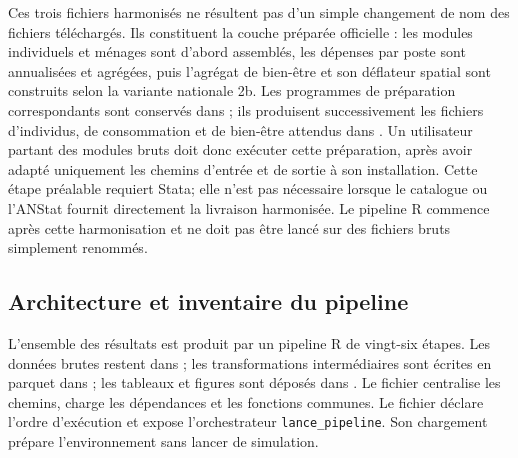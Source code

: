 \documentclass[11pt,a4paper]{article}
\begin{document}
Ces trois fichiers harmonisés ne résultent pas d'un simple changement de nom
des fichiers téléchargés. Ils constituent la couche préparée officielle :
les modules individuels et ménages sont d'abord assemblés, les dépenses par
poste sont annualisées et agrégées, puis l'agrégat de bien-être et son
déflateur spatial sont construits selon la variante nationale 2b. Les
programmes de préparation correspondants sont conservés dans
; ils produisent successivement les fichiers
d'individus, de consommation et de bien-être attendus dans
. Un utilisateur partant des modules bruts doit
donc exécuter cette préparation, après avoir adapté uniquement les chemins
d'entrée et de sortie à son installation. Cette étape préalable requiert Stata;
elle n'est pas nécessaire lorsque le catalogue ou l'ANStat fournit directement
la livraison harmonisée. Le pipeline R commence après cette harmonisation et
ne doit pas être lancé sur des fichiers bruts simplement renommés.

\subsection{Architecture et inventaire du pipeline}

L'ensemble des résultats est produit par un pipeline R de vingt-six étapes. Les
données brutes restent dans ; les transformations
intermédiaires sont écrites en parquet dans ; les
tableaux et figures sont déposés dans . Le fichier
 centralise les chemins, charge les dépendances et
les fonctions communes. Le fichier  déclare
l'ordre d'exécution et expose l'orchestrateur \texttt{lance\_pipeline}. Son
chargement prépare l'environnement sans lancer de simulation.
\end{document}
